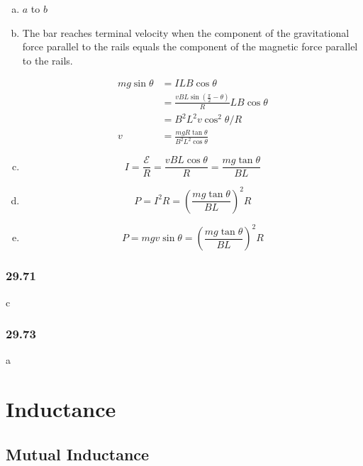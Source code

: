 \documentclass{article}
\begin{document}
\begin{enumerate}[(a)]
  \item $a$ to $b$

  \item The bar reaches terminal velocity when the component of the gravitational force parallel to the rails equals the component of the magnetic force parallel to the rails.

        \begin{align*}
          m g \sin \theta & = I L B \cos \theta                                                          \\
                          & = \frac{v B L \sin \left( \frac{\pi}{2} - \theta \right)}{R} L B \cos \theta \\
                          & = B^2 L^2 v \cos^2 \theta / R                                                \\
          v               & = \frac{m g R \tan \theta}{B^2 L^2 \cos \theta}
        \end{align*}

  \item \[I = \frac{\mathcal{E}}{R} = \frac{v B L \cos \theta}{R} = \frac{m g \tan \theta}{B L}\]

  \item \[P = I^2 R = \left( \frac{m g \tan \theta}{B L} \right)^2 R\]

  \item \[P = m g v \sin \theta = \left( \frac{m g \tan \theta}{B L} \right)^2 R\]
\end{enumerate}

\subsubsection{29.71}

c

\subsubsection{29.73}

a

\section{Inductance}

\subsection{Mutual Inductance}
\end{document}
